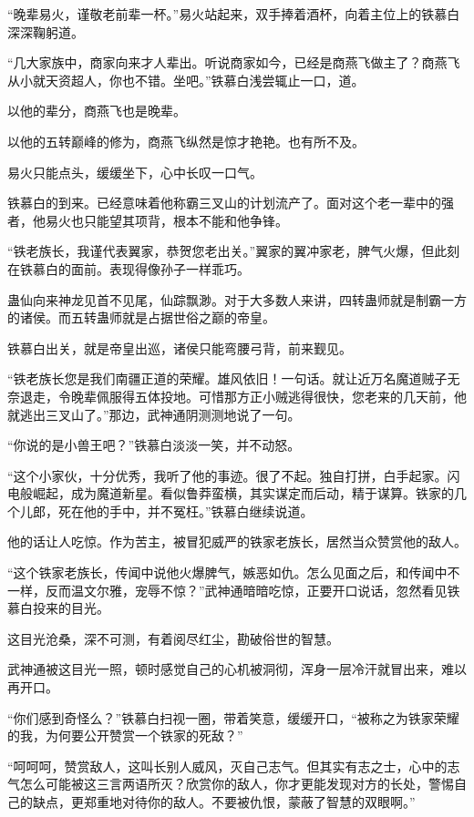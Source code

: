 \begin{this_body}
“晚辈易火，谨敬老前辈一杯。”易火站起来，双手捧着酒杯，向着主位上的铁慕白深深鞠躬道。

“几大家族中，商家向来才人辈出。听说商家如今，已经是商燕飞做主了？商燕飞从小就天资超人，你也不错。坐吧。”铁慕白浅尝辄止一口，道。

以他的辈分，商燕飞也是晚辈。

以他的五转巅峰的修为，商燕飞纵然是惊才艳艳。也有所不及。

易火只能点头，缓缓坐下，心中长叹一口气。

铁慕白的到来。已经意味着他称霸三叉山的计划流产了。面对这个老一辈中的强者，他易火也只能望其项背，根本不能和他争锋。

“铁老族长，我谨代表翼家，恭贺您老出关。”翼家的翼冲家老，脾气火爆，但此刻在铁慕白的面前。表现得像孙子一样乖巧。

蛊仙向来神龙见首不见尾，仙踪飘渺。对于大多数人来讲，四转蛊师就是制霸一方的诸侯。而五转蛊师就是占据世俗之巅的帝皇。

铁慕白出关，就是帝皇出巡，诸侯只能弯腰弓背，前来觐见。

“铁老族长您是我们南疆正道的荣耀。雄风依旧！一句话。就让近万名魔道贼子无奈退走，令晚辈佩服得五体投地。可惜那方正小贼逃得很快，您老来的几天前，他就逃出三叉山了。”那边，武神通阴测测地说了一句。

“你说的是小兽王吧？”铁慕白淡淡一笑，并不动怒。

“这个小家伙，十分优秀，我听了他的事迹。很了不起。独自打拼，白手起家。闪电般崛起，成为魔道新星。看似鲁莽蛮横，其实谋定而后动，精于谋算。铁家的几个儿郎，死在他的手中，并不冤枉。”铁慕白继续说道。

他的话让人吃惊。作为苦主，被冒犯威严的铁家老族长，居然当众赞赏他的敌人。

“这个铁家老族长，传闻中说他火爆脾气，嫉恶如仇。怎么见面之后，和传闻中不一样，反而温文尔雅，宠辱不惊？”武神通暗暗吃惊，正要开口说话，忽然看见铁慕白投来的目光。

这目光沧桑，深不可测，有着阅尽红尘，勘破俗世的智慧。

武神通被这目光一照，顿时感觉自己的心机被洞彻，浑身一层冷汗就冒出来，难以再开口。

“你们感到奇怪么？”铁慕白扫视一圈，带着笑意，缓缓开口，“被称之为铁家荣耀的我，为何要公开赞赏一个铁家的死敌？”

“呵呵呵，赞赏敌人，这叫长别人威风，灭自己志气。但其实有志之士，心中的志气怎么可能被这三言两语所灭？欣赏你的敌人，你才更能发现对方的长处，警惕自己的缺点，更郑重地对待你的敌人。不要被仇恨，蒙蔽了智慧的双眼啊。”


\end{this_body}
